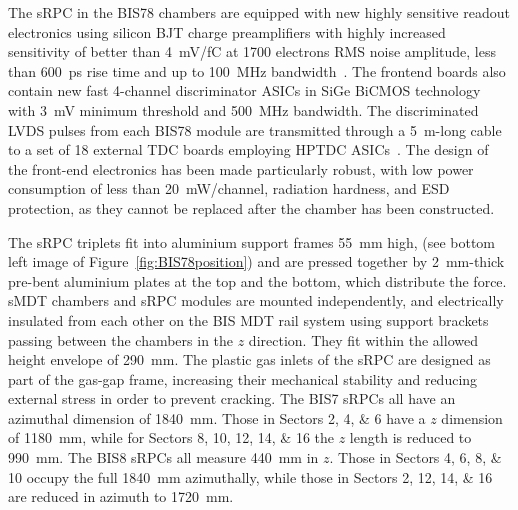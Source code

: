 \documentclass[cernpreprint, atlasdraft=false, UKenglish,british,orcidlogo, texmf, orcidlogo]{atlasdoc}
\begin{document}
 
The \gls{sRPC} in the \gls{BIS78} chambers are equipped with new highly sensitive readout electronics using silicon \gls{BJT} charge preamplifiers with highly increased sensitivity of better than \SI{4}{\milli\volt/\femto\coulomb} at \num{1700} electrons RMS noise amplitude,
less than \SI{600}{\ps} rise time and up to \SI{100}{\MHz} bandwidth~\cite{RPC_FE}. The frontend boards also contain new fast 4-channel discriminator \glspl{ASIC} in SiGe \gls{BiCMOS} technology with \SI{3}{\milli\volt} minimum threshold and \SI{500}{\MHz} bandwidth.
The discriminated \gls{LVDS} pulses from each \gls{BIS78} module are transmitted through a \SI{5}{\m}-long cable to a set of 18 external \gls{TDC} boards employing \gls{HPTDC} \glspl{ASIC}~\cite{HPTDC}.
The design of the front-end electronics has been made particularly robust, with low power consumption of less than \SI{20}{\milli\watt}/channel, radiation hardness, and \gls{ESD} protection, as they cannot be replaced after the chamber has been constructed.
 
The \gls{sRPC} triplets fit into aluminium support frames \SI{55}{\mm} high, (see bottom left image of Figure~\ref{fig:BIS78position})
and are pressed together by \SI{2}{\mm}-thick pre-bent aluminium plates at the top and the bottom, which distribute the force.
\gls{sMDT} chambers and \gls{sRPC} modules are mounted independently, and electrically insulated from each other on the
BIS \gls{MDT} rail system using support brackets passing between the chambers in the $z$ direction. They fit within the allowed height envelope of \SI{290}{\mm}.
The plastic gas inlets of the \gls{sRPC} are designed as part of the gas-gap frame, increasing their mechanical stability and reducing external stress in order to prevent cracking.
The BIS7 \glspl{sRPC} all have an azimuthal dimension of \SI{1840}{\mm}. Those in Sectors \numlist{2;4;6} have a $z$ dimension of \SI{1180}{\mm}, while for Sectors \numlist{8;10;12;14;16} the $z$ length is reduced to \SI{990}{\mm}.
The BIS8 \glspl{sRPC} all measure \SI{440}{\mm} in $z$. Those in Sectors \numlist{4;6;8;10} occupy the full \SI{1840}{\mm} azimuthally, while those in Sectors \numlist{2;12;14;16} are reduced in azimuth to \SI{1720}{\mm}.
 
\end{document}
